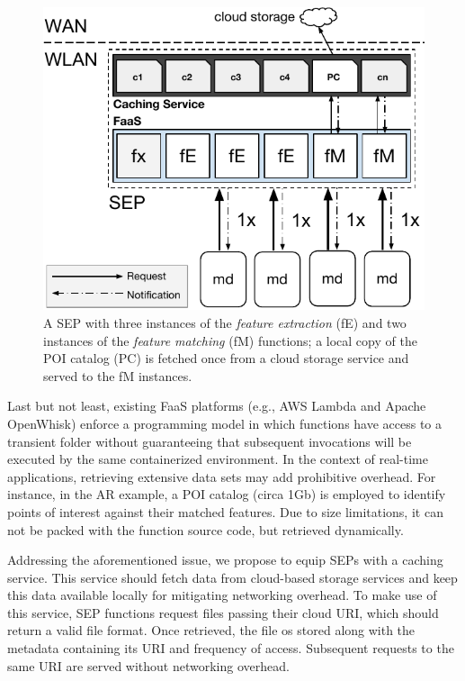 \documentclass[letterpaper, 10 pt, conference]{ieeeconf}  %
\begin{document}
\begin{figure}[tbp]
	\centering
	\includegraphics[width=\linewidth]{Figs/Mobile_Computation_Offloading_Caching.pdf}
	\caption{A SEP with three instances of the \textit{feature extraction} (fE) and two instances of the \textit{feature matching} (fM) functions; a local copy of the POI catalog (PC) is fetched once from a cloud storage service and served to the fM instances.} 
	\label{fig:Mobile_Computation_Offloading_Caching}
\end{figure}

Last but not least, existing FaaS platforms (e.g., AWS Lambda and Apache OpenWhisk) enforce a programming model in which functions have access to a transient folder without guaranteeing that subsequent invocations will be executed by the same containerized environment. %
In the context of real-time applications, retrieving extensive data sets may add prohibitive overhead. For instance, in the AR example, a POI catalog (circa 1Gb) is employed to identify points of interest against their matched features. Due to size limitations, it can not be packed with the function source code, but retrieved dynamically.

Addressing the aforementioned issue, we propose to equip SEPs with a caching service. This service should fetch data from cloud-based storage services and keep this data available locally for mitigating networking overhead. 
To make use of this service, SEP functions request files passing their cloud URI, which should return a valid file format.
Once retrieved, the file os stored along with the metadata containing its URI and frequency of access. Subsequent requests to the same URI are served without networking overhead.
\end{document}
